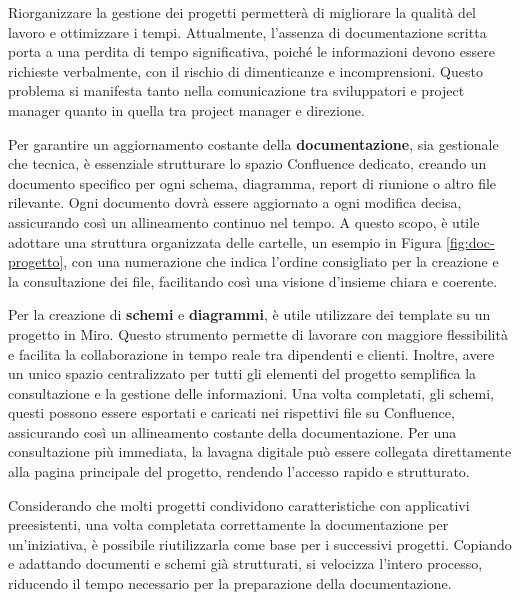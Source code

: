 Riorganizzare la gestione dei progetti permetterà di migliorare la qualità
del lavoro e ottimizzare i tempi. Attualmente, l'assenza di documentazione scritta porta a una perdita di tempo significativa, poiché
le informazioni devono essere richieste verbalmente, con il rischio di dimenticanze e incomprensioni. Questo problema si manifesta tanto
nella comunicazione tra sviluppatori e project manager quanto in quella tra project manager e direzione.

Per garantire un aggiornamento costante della \textbf{documentazione}, sia gestionale che tecnica, è essenziale strutturare lo spazio Confluence dedicato,
creando un documento specifico per ogni schema, diagramma, report di riunione o altro file rilevante. Ogni documento dovrà essere aggiornato a ogni
modifica decisa, assicurando così un allineamento continuo nel tempo. A questo scopo, è utile adottare una struttura organizzata delle cartelle,
un esempio in Figura \ref{fig:doc-progetto},
con una numerazione che indica l’ordine consigliato per la creazione e la consultazione dei file, facilitando così una visione d’insieme
chiara e coerente.

Per la creazione di \textbf{schemi} e \textbf{diagrammi}, è utile utilizzare dei template su un progetto in Miro. Questo strumento permette di
lavorare con maggiore flessibilità e facilita la collaborazione in tempo reale tra dipendenti e clienti. Inoltre, avere un unico spazio
centralizzato per tutti gli elementi del progetto semplifica la consultazione e la gestione delle informazioni. Una volta completati,
gli schemi, questi possono essere esportati e caricati nei rispettivi file su Confluence, assicurando così un allineamento costante della
documentazione. Per una consultazione più immediata, la lavagna digitale può essere collegata direttamente alla pagina principale del progetto,
rendendo l’accesso rapido e strutturato.

Considerando che molti progetti condividono caratteristiche con applicativi preesistenti, una volta completata correttamente la
documentazione per un’iniziativa, è possibile riutilizzarla come base per i successivi progetti. Copiando e adattando documenti e
schemi già strutturati, si velocizza l’intero processo, riducendo il tempo necessario per la preparazione della documentazione.


